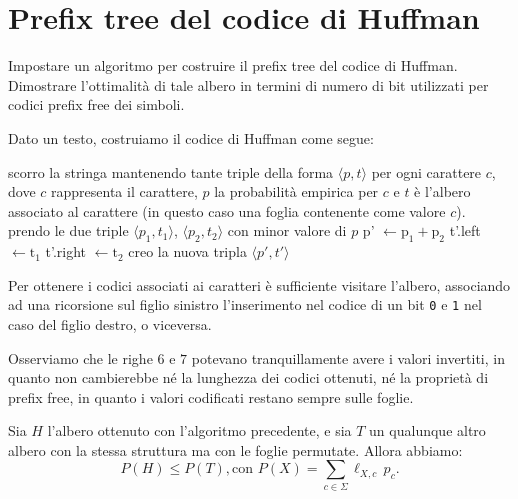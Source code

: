 \chapter{Prefix tree del codice di Huffman}

\begin{problem*}
  Impostare un algoritmo per costruire il prefix tree del codice di
  Huffman. Dimostrare l'ottimalit\`a di tale albero in termini di numero
  di bit utilizzati per codici prefix free dei simboli.
\end{problem*}

Dato un testo, costruiamo il codice di Huffman come segue:
\begin{algorithm}
    \caption{Algoritmo per la costruzione del prefix tree del codice di Huffman}
    \begin{algorithmic}[1]
        \State scorro la stringa mantenendo tante triple della forma \(\langle p,
        t\rangle\) per ogni carattere \(c\), dove \(c\) rappresenta il carattere,
        \(p\) la probabilità empirica per \(c\) e \(t\) è l'albero associato al
        carattere (in questo caso una foglia contenente come valore \(c\)).
            \State prendo le due triple \(\langle p_1, t_1\rangle\), \(\langle
            p_2, t_2\rangle\) con minor valore di \(p\)
            \State p' \(\gets \text{p}_1 + \text{p}_2\)
            \State t'.left \(\gets \text{t}_1\)
            \State t'.right \(\gets \text{t}_2\)
            \State creo la nuova tripla \(\langle p', t'\rangle\)
        \EndWhile
    \end{algorithmic}
\end{algorithm}

Per ottenere i codici associati ai caratteri è sufficiente visitare l'albero,
associando ad una ricorsione sul figlio sinistro l'inserimento nel codice di un
bit \texttt{0} e \texttt{1} nel caso del figlio destro, o viceversa.

Osserviamo che le righe \(6\) e \(7\) potevano tranquillamente avere i valori
invertiti, in quanto non cambierebbe n\'e la lunghezza dei codici ottenuti,
n\'e la proprietà di prefix free, in quanto i valori codificati restano sempre
sulle foglie.

\begin{lemma}[Ottimalità]
Sia \(H\) l'albero ottenuto con l'algoritmo precedente, e sia \(T\) un qualunque altro albero con la stessa struttura ma con le foglie permutate. Allora abbiamo:
\[
    P(H) \le P(T), \mbox{con } P(X) = \sum_{c \in \Sigma} \ell_{X, c} \, p_c\text{.}
\]
\end{lemma}

